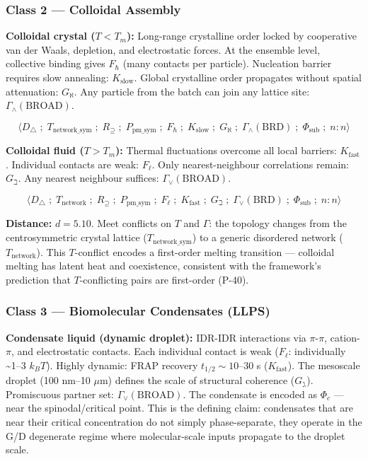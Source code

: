 \documentclass[12pt,a4paper]{article}
\begin{document}
\subsubsection{Class 2 --- Colloidal Assembly}

\textbf{Colloidal crystal ($T < T_m$):} Long-range crystalline order locked by cooperative van der Waals, depletion, and electrostatic forces. At the ensemble level, collective binding gives $F_\hbar$ (many contacts per particle). Nucleation barrier requires slow annealing: $K_\text{slow}$. Global crystalline order propagates without spatial attenuation: $G_\aleph$. Any particle from the batch can join any lattice site: $\Gamma_\wedge(\text{BROAD})$.

\[\langle D_\triangle \;;\; T_{\text{network\_sym}} \;;\; R_{\supseteq} \;;\; P_{\text{pm\_sym}} \;;\; F_\hbar \;;\; K_\text{slow} \;;\; G_\aleph \;;\; \Gamma_\wedge(\text{BRD}) \;;\; \Phi_\text{sub} \;;\; n:n \rangle\]

\textbf{Colloidal fluid ($T > T_m$):} Thermal fluctuations overcome all local barriers: $K_\text{fast}$. Individual contacts are weak: $F_\ell$. Only nearest-neighbour correlations remain: $G_\beth$. Any nearest neighbour suffices: $\Gamma_\vee(\text{BROAD})$.

\[\langle D_\triangle \;;\; T_\text{network} \;;\; R_{\supseteq} \;;\; P_{\text{pm\_sym}} \;;\; F_\ell \;;\; K_\text{fast} \;;\; G_\beth \;;\; \Gamma_\vee(\text{BRD}) \;;\; \Phi_\text{sub} \;;\; n:n \rangle\]

\textbf{Distance:} $d = 5.10$. Meet conflicts on $T$ and $\Gamma$: the topology changes from the centrosymmetric crystal lattice ($T_{\text{network\_sym}}$) to a generic disordered network ($T_\text{network}$). This $T$-conflict encodes a first-order melting transition --- colloidal melting has latent heat and coexistence, consistent with the framework's prediction that $T$-conflicting pairs are first-order (P-40).

\subsubsection{Class 3 --- Biomolecular Condensates (LLPS)}

\textbf{Condensate liquid (dynamic droplet):} IDR-IDR interactions via $\pi$-$\pi$, cation-$\pi$, and electrostatic contacts. Each individual contact is weak ($F_\ell$: individually \textasciitilde{}1--3 $k_BT$). Highly dynamic: FRAP recovery $t_{1/2} \sim 10$--30 s ($K_\text{fast}$). The mesoscale droplet (100 nm--10 $\mu$m) defines the scale of structural coherence ($G_\gimel$). Promiscuous partner set: $\Gamma_\vee(\text{BROAD})$. The condensate is encoded as $\Phi_c$ --- near the spinodal/critical point. This is the defining claim: condensates that are near their critical concentration do not simply phase-separate, they operate in the G/D degenerate regime where molecular-scale inputs propagate to the droplet scale.
\end{document}
